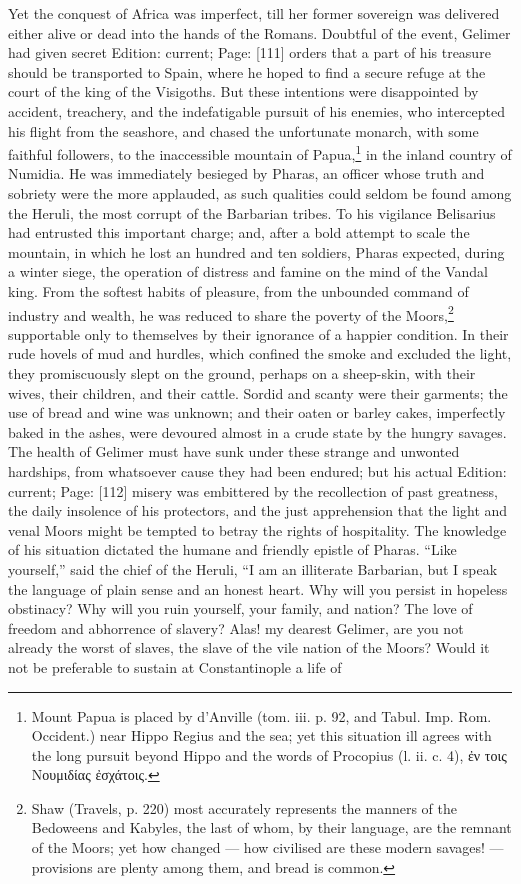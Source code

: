 Yet the conquest of Africa was imperfect, till her former sovereign was delivered either alive or dead into the hands of the Romans. Doubtful of the event, Gelimer had given secret Edition: current; Page: [111] orders that a part of his treasure should be transported to Spain, where he hoped to find a secure refuge at the court of the king of the Visigoths. But these intentions were disappointed by accident, treachery, and the indefatigable pursuit of his enemies, who intercepted his flight from the seashore, and chased the unfortunate monarch, with some faithful followers, to the inaccessible mountain of Papua,\footnote{Mount Papua is placed by d\texthebrew{}’Anville (tom. iii. p. 92, and Tabul. Imp. Rom. Occident.) near Hippo Regius and the sea; yet this situation ill agrees with the long pursuit beyond Hippo and the words of Procopius (l. ii. c. 4), \textgreek{\texthebrew{ἐ}ν τοις Νουμιδίας \texthebrew{ἐ}σχάτοις}.} in the inland country of Numidia. He was immediately besieged by Pharas, an officer whose truth and sobriety were the more applauded, as such qualities could seldom be found among the Heruli, the most corrupt of the Barbarian tribes. To his vigilance Belisarius had entrusted this important charge; and, after a bold attempt to scale the mountain, in which he lost an hundred and ten soldiers, Pharas expected, during a winter siege, the operation of distress and famine on the mind of the Vandal king. From the softest habits of pleasure, from the unbounded command of industry and wealth, he was reduced to share the poverty of the Moors,\footnote{Shaw (Travels, p. 220) most accurately represents the manners of the Bedoweens and Kabyles, the last of whom, by their language, are the remnant of the Moors; yet how changed \texthebrew{—} how civilised are these modern savages! \texthebrew{—} provisions are plenty among them, and bread is common.} supportable only to themselves by their ignorance of a happier condition. In their rude hovels of mud and hurdles, which confined the smoke and excluded the light, they promiscuously slept on the ground, perhaps on a sheep-skin, with their wives, their children, and their cattle. Sordid and scanty were their garments; the use of bread and wine was unknown; and their oaten or barley cakes, imperfectly baked in the ashes, were devoured almost in a crude state by the hungry savages. The health of Gelimer must have sunk under these strange and unwonted hardships, from whatsoever cause they had been endured; but his actual Edition: current; Page: [112] misery was embittered by the recollection of past greatness, the daily insolence of his protectors, and the just apprehension that the light and venal Moors might be tempted to betray the rights of hospitality. The knowledge of his situation dictated the humane and friendly epistle of Pharas. \texthebrew{“}Like yourself,\texthebrew{}” said the chief of the Heruli, \texthebrew{“}I am an illiterate Barbarian, but I speak the language of plain sense and an honest heart. Why will you persist in hopeless obstinacy? Why will you ruin yourself, your family, and nation? The love of freedom and abhorrence of slavery? Alas! my dearest Gelimer, are you not already the worst of slaves, the slave of the vile nation of the Moors? Would it not be preferable to sustain at Constantinople a life of 